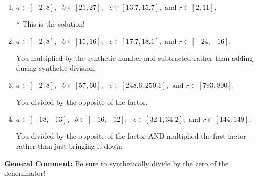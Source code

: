 \documentclass{extbook}[14pt]
\begin{document}
\begin{enumerate}
{\begin{enumerate}[label=\Alph*.]
 You multiplied by the synthetic number rather than bringing the first factor down.
\item \( a \in [-2, 8], \text{   } b \in [21, 27], \text{   } c \in [13.7, 15.7], \text{   and   } r \in [2, 11]. \)

* This is the solution!
\item \( a \in [-2, 8], \text{   } b \in [15, 16], \text{   } c \in [17.7, 18.1], \text{   and   } r \in [-24, -16]. \)

 You multiplied by the synthetic number and subtracted rather than adding during synthetic division.
\item \( a \in [-2, 8], \text{   } b \in [57, 60], \text{   } c \in [248.6, 250.1], \text{   and   } r \in [793, 800]. \)

 You divided by the opposite of the factor.
\item \( a \in [-18, -13], \text{   } b \in [-16, -12], \text{   } c \in [32.1, 34.2], \text{   and   } r \in [144, 149]. \)

 You divided by the opposite of the factor AND multiplied the first factor rather than just bringing it down.
\end{enumerate}

\textbf{General Comment:} Be sure to synthetically divide by the zero of the denominator!
}
\end{enumerate}
\end{document}
